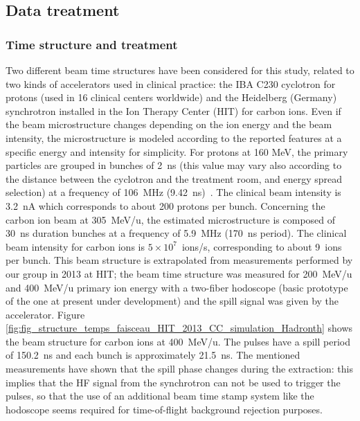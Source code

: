 \subsection{Data treatment}
\label{subsection:Treatment_data_CC_hadrontherapy_Geant4}

\subsubsection{Time structure and treatment}
\label{subsubsection:modelisation_fasceau_ions_CC_hadrontherapy_Geant4}
 
Two different beam time structures have been considered for this study, related to two kinds of accelerators used in clinical practice: the IBA C230 cyclotron for protons (used in 16 clinical centers worldwide) and the Heidelberg (Germany) synchrotron installed in the Ion Therapy Center (HIT) for carbon ions. Even if the beam microstructure changes depending on the ion energy and the beam intensity, the microstructure is modeled according to the reported features at a specific energy and intensity for simplicity. For protons at 160 MeV, the primary particles are grouped in bunches of 2~ns (this value may vary also according to the distance between the cyclotron and the treatment room, and energy spread selection) at a frequency of 106~MHz (9.42~ns)~\cite{f_roellinghoff_real-time_2014}. The clinical beam intensity is 3.2~nA which corresponds to about 200 protons per bunch. Concerning the carbon ion beam at 305~MeV/u, the estimated microstructure is composed of 30~ns duration bunches at a frequency of 5.9~MHz (170~ns period). The clinical beam intensity for carbon ions is $5\times10^7$~ions/s, corresponding to about 9~ions per bunch. This beam structure is extrapolated from measurements performed by our group in 2013 at HIT; the beam time structure was measured for 200~MeV/u and 400~MeV/u primary ion energy with a two-fiber hodoscope (basic prototype of the one at present under development) and the spill signal was given by the accelerator. Figure \ref{fig:fig_structure_temps_faisceau_HIT_2013_CC_simulation_Hadronth} shows the beam structure for carbon ions at 400~MeV/u. The pulses have a spill period of 150.2~ns and each bunch is approximately 21.5~ns.
The mentioned measurements have shown that the spill phase changes during the extraction: this implies that the HF signal from the synchrotron can not be used to trigger the pulses, so that the use of an additional beam time stamp system like the hodoscope seems required for time-of-flight background rejection purposes.\newline

